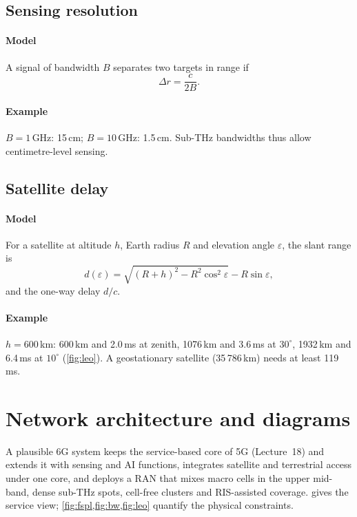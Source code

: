 \documentclass[11pt,a4paper]{article}
\begin{document}
\subsection{Sensing resolution}\label{sec:isac}
\paragraph{Model} A signal of bandwidth $B$ separates two targets in range if
\begin{equation}\label{eq:range}
  \Delta r = \frac{c}{2B} .
\end{equation}
\paragraph{Example} $B = 1$\,GHz: 15\,cm; $B = 10$\,GHz: 1.5\,cm. Sub-THz bandwidths thus allow centimetre-level sensing.

\subsection{Satellite delay}\label{sec:leo}
\paragraph{Model} For a satellite at altitude $h$, Earth radius $R$ and elevation angle $\varepsilon$, the slant range is
\begin{equation}\label{eq:slant}
  d(\varepsilon) = \sqrt{(R + h)^2 - R^2\cos^2\varepsilon} - R\sin\varepsilon ,
\end{equation}
and the one-way delay $d/c$.
\paragraph{Example} $h = 600$\,km: 600\,km and 2.0\,ms at zenith, 1076\,km and 3.6\,ms at $30^\circ$, 1932\,km and 6.4\,ms at $10^\circ$ (\cref{fig:leo}). A
geostationary satellite (35\,786\,km) needs at least 119\,ms.

\begin{acnfigure}
  \caption{One-way propagation delay to a LEO satellite (\cref{eq:slant}).}
  \label{fig:leo}
\end{acnfigure}

\section{Network architecture and diagrams}
A plausible 6G system keeps the service-based core of 5G (Lecture~18) and extends it with sensing and AI functions, integrates satellite and
terrestrial access under one core, and deploys a RAN that mixes macro cells in the upper mid-band, dense sub-THz spots, cell-free clusters
and RIS-assisted coverage.  gives the service view; \cref{fig:fspl,fig:bw,fig:leo} quantify the physical constraints.
\end{document}
